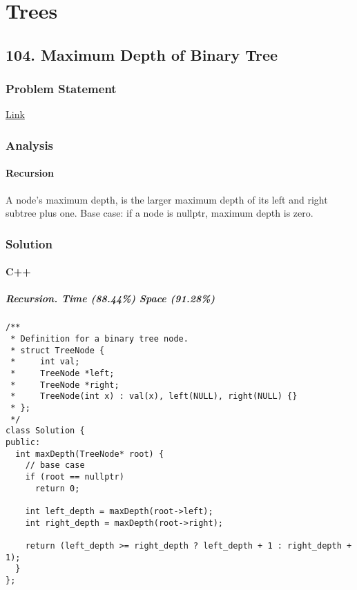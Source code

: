 \documentclass[12pt]{book}
\begin{document}
\part{Trees}
\label{sec:org1d7e6c4}
\chapter{104. Maximum Depth of Binary Tree}
\label{sec:org021cbc2}
\section{Problem Statement}
\label{sec:org6318246}
\href{https://leetcode.com/problems/maximum-depth-of-binary-tree/}{Link}
\section{Analysis}
\label{sec:org9816d22}
\subsection{Recursion}
\label{sec:orgb094214}
A node's maximum depth, is the larger maximum depth of its left and right subtree plus one. Base case: if a node is nullptr, maximum depth is zero.
\section{Solution}
\label{sec:orgcf3ee04}
\subsection{C++}
\label{sec:org1cc659c}
\subsubsection{Recursion. Time (88.44\%) Space (91.28\%)}
\label{sec:org3d0ec89}
\begin{verbatim}
/**
 * Definition for a binary tree node.
 * struct TreeNode {
 *     int val;
 *     TreeNode *left;
 *     TreeNode *right;
 *     TreeNode(int x) : val(x), left(NULL), right(NULL) {}
 * };
 */
class Solution {
public:
  int maxDepth(TreeNode* root) {
    // base case 
    if (root == nullptr)
      return 0;

    int left_depth = maxDepth(root->left);
    int right_depth = maxDepth(root->right);

    return (left_depth >= right_depth ? left_depth + 1 : right_depth + 1);
  }
};
\end{verbatim}
\end{document}
